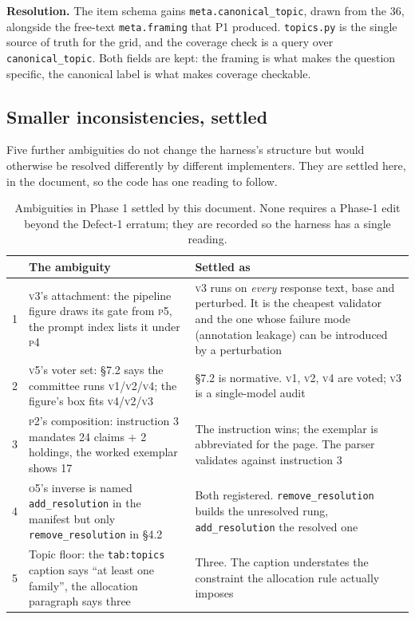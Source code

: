 \documentclass[11pt]{article}
\newcommand{\pymod}[1]{\texttt{#1}}
\begin{document}
\noindent\textbf{Resolution.} The item schema gains \texttt{meta.canonical\_topic}, drawn from the
36, alongside the free-text \texttt{meta.framing} that P1 produced. \pymod{topics.py} is the single
source of truth for the grid, and the coverage check is a query over
\texttt{canonical\_topic}. Both fields are kept: the framing is what makes the question specific,
the canonical label is what makes coverage checkable.

\subsection{Smaller inconsistencies, settled}

Five further ambiguities do not change the harness's structure but would otherwise be resolved
differently by different implementers. They are settled here, in the document, so the code has one
reading to follow.

\begin{table}[h]\centering\small
\renewcommand{\arraystretch}{1.15}
\begin{tabular}{@{}lp{5.4cm}p{6.2cm}@{}}
\toprule
& \textbf{The ambiguity} & \textbf{Settled as}\\
\midrule
1 & \textsc{v3}'s attachment: the pipeline figure draws its gate from \textsc{p5}, the prompt
    index lists it under \textsc{p4} & \textsc{v3} runs on \emph{every} response text, base and
    perturbed. It is the cheapest validator and the one whose failure mode (annotation leakage)
    can be introduced by a perturbation\\
2 & \textsc{v5}'s voter set: §7.2 says the committee runs \textsc{v1}/\textsc{v2}/\textsc{v4};
    the figure's box fits \textsc{v4}/\textsc{v2}/\textsc{v3} & §7.2 is normative. \textsc{v1},
    \textsc{v2}, \textsc{v4} are voted; \textsc{v3} is a single-model audit\\
3 & \textsc{p2}'s composition: instruction 3 mandates 24 claims $+$ 2 holdings, the worked
    exemplar shows 17 & The instruction wins; the exemplar is abbreviated for the page. The parser
    validates against instruction 3\\
4 & \textsc{o5}'s inverse is named \texttt{add\_resolution} in the manifest but only
    \texttt{remove\_resolution} in §4.2 & Both registered. \texttt{remove\_resolution} builds the
    unresolved rung, \texttt{add\_resolution} the resolved one\\
5 & Topic floor: the \texttt{tab:topics} caption says ``at least one family'', the allocation
    paragraph says three & Three. The caption understates the constraint the allocation rule
    actually imposes\\
\bottomrule
\end{tabular}
\caption{Ambiguities in Phase 1 settled by this document. None requires a Phase-1 edit beyond the
Defect-1 erratum; they are recorded so the harness has a single reading.}
\label{tab:ambiguities}
\end{table}
\end{document}
